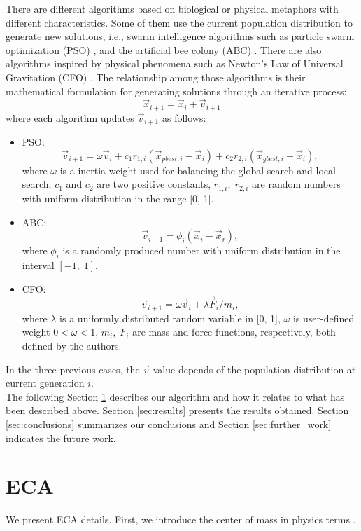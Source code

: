 \documentclass{svproc}
\begin{document}
There are different algorithms based on biological or physical metaphors with 
different characteristics. Some of them use the current population distribution 
to generate new solutions, i.e., swarm intelligence algorithms such as particle 
swarm optimization (PSO) \cite{pso1995}, and the artificial bee colony (ABC) \cite{abc2005}. 
There are also algorithms inspired by physical phenomena such as Newton's Law of 
Universal Gravitation (CFO) \cite{fisicaSurvey,cfo2007}. The relationship among those  
algorithms  is their mathematical formulation for generating solutions 
through an iterative process:
%
\begin{equation}
	\vec{x}_{i + 1} = \vec{x}_{i} + \vec{v}_{i + 1}
	\label{eqn:xxv}
\end{equation}
%
where each algorithm updates $\vec{v}_{i+1} $ as follows:
\begin{itemize}
	\item PSO:
		$$
			\vec{v}_{i + 1} = \omega \vec{v}_{i} +  
					c_1 r_{1, i} ( \vec{x}_{pbest, i} - \vec{x}_i ) + 
					c_2 r_{2, i} ( \vec{x}_{gbest, i} - \vec{x}_i ),
		$$
		where $\omega$ is a inertia weight used for balancing the global search 
		and local search, $c_1$ and $c_2$ are two positive constants, $r_{1, i},\; r_{2, i}$ 
		are random numbers with uniform distribution in the range [0, 1].
	\item ABC:
		$$
			\vec{v}_{i + 1} = \phi_i (\vec{x}_i - \vec{x}_{r}),
		$$
	where $\phi_i$ is a randomly produced number with uniform distribution 
	in the interval $[-1,\;1]$.
	\item CFO: $$
		\vec{v}_{i + 1} = \omega \vec{v}_{i} + {\lambda \vec{F}_{i}} / {m_i},
		$$
		where $\lambda$ is a uniformly distributed random variable in [0, 1], $\omega$ 
		is user-defined weight $0 < \omega < 1$, $m_i,\; F_i$ are mass and force 
		functions, respectively, both defined by the authors.
\end{itemize}
%
%
In the three previous cases, the $\vec{v}$ value  depends of the population 
distribution at current generation $i$.\\

The following Section \ref{sec:eca} describes our algorithm and how it 
relates to what has been  described above. Section \ref{sec:results} 
presents the results obtained.  Section \ref{sec:conclusions} summarizes 
our conclusions and Section \ref{sec:further_work}  indicates the future work. 

\section{ECA} %
\label{sec:eca}
%
%
We present ECA details. First, we introduce the center of mass in physics 
terms \cite{kleppner73,serway}.
\end{document}
